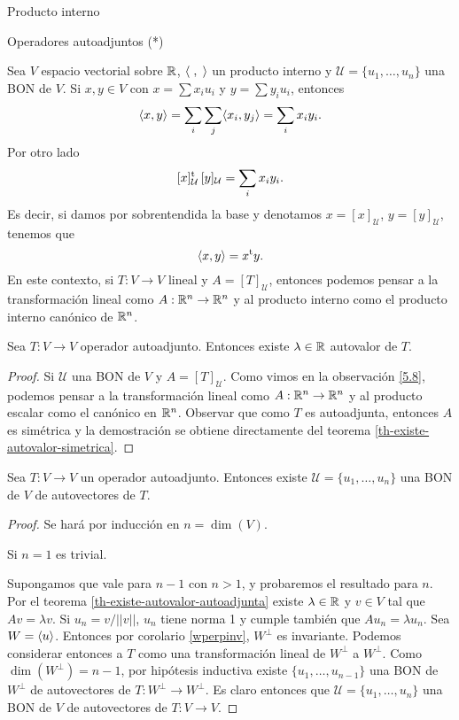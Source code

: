 \begin{chapter}{Producto interno}
\begin{section}{Operadores autoadjuntos (*)}
        \begin{observacion}\label{5.8}
            Sea $V$ espacio vectorial  sobre $\mathbb R$, $\langle\;,\;\rangle$ un producto interno y $\mathcal{U} = \{u_1,\ldots,u_n\}$ una BON de $V$. Si $x,y \in V$ con $x = \sum x_iu_i$ y $y = \sum y_i u_i$, entonces
            $$
            \langle x,y\rangle = \sum_i\sum_j \langle x_i,y_j\rangle = \sum_i x_iy_i.
            $$
            Por otro lado 
            $$
            [x]_\mathcal{U}^{\operatorname{t}} \, [y]_\mathcal{U} = \sum_i x_iy_i.
            $$
            Es decir, si damos por sobrentendida la base y denotamos $x = [x]_\mathcal{U}$, $ y =[y]_\mathcal{U}$, tenemos que
            $$
            \langle x,y\rangle = x^{\operatorname{t}} y .
            $$
            En este contexto, si $T: V \to V$ lineal y $A= [T]_\mathcal{U}$, entonces podemos pensar a la transformación lineal como $A: \mathbb R^n \to \mathbb R^n$ y al producto interno como  el producto interno canónico de $\mathbb R^n$.
        \end{observacion}
        
        
        
        \begin{teorema}\label{th-existe-autovalor-autoadjunta}
            Sea $T:V\to V$ operador autoadjunto. Entonces existe $\lambda \in \mathbb R$ autovalor de $T$.   
        \end{teorema}
        \begin{proof}
            Si $\mathcal{U}$ una BON de $V$ y $A = [T]_\mathcal{U}$. Como vimos  en  la observación \ref{5.8}, podemos pensar a la transformación lineal como  $A: \mathbb R^n \to \mathbb R^n$ y  al producto escalar como el canónico  en $\mathbb R^n$. Observar que como $T$ es autoadjunta, entonces $A$ es simétrica y  la demostración se obtiene directamente del teorema \ref{th-existe-autovalor-simetrica}.  
            \end{proof}
        
        \begin{teorema} Sea $T: V \to V$ un operador autoadjunto. Entonces existe $\mathcal{U} = \{u_1,\ldots,u_n\}$ una BON de $V$ de autovectores de $T$.
        \end{teorema}
        \begin{proof}
            Se hará por inducción en $n= \dim(V)$.
            
            Si $n=1$ es trivial. 
            
            Supongamos que vale  para $n-1$ con $n >1$, y  probaremos el resultado para $n$. Por el teorema  \ref{th-existe-autovalor-autoadjunta} existe $\lambda \in \mathbb R$ y $v \in V$ tal que $Av = \lambda v$. Si $u_n = v/||v||$, $u_n$ tiene norma 1 y  cumple también que $Au_n = \lambda u_n$. Sea $W = \langle u \rangle$. Entonces por  corolario \ref{wperpinv}, $W^\perp$ es invariante. Podemos considerar entonces a  $T$ como una transformación lineal de $W^\perp$ a $W^\perp$. Como $\dim(W^\perp) = n-1$, por hipótesis inductiva existe   $\{u_1,\ldots,u_{n-1}\}$ una BON de $W^\perp$ de autovectores de $T: W^\perp \to W^\perp$. Es claro entonces que $\mathcal{U} = \{u_1,\ldots,u_n\}$  una BON de $V$ de autovectores de $T:V \to V$. 
        \end{proof}
        

\end{section}
\end{chapter}
